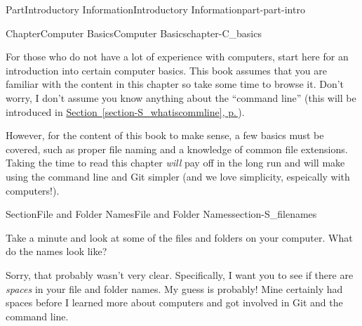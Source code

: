 \documentclass[twoside,10pt,]{book}
\newcommand{\xreffont}{\relax}
\begin{document}
\setcounter{tocdepth}{0}
\renewcommand*\contentsname{Contents}
\tableofcontents
\mainmatter
%
%
\typeout{************************************************}
\typeout{************************************************}
%
\begin{partptx}{Part}{Introductory Information}{}{Introductory Information}{}{}{part-part-intro}
\renewcommand*{\partname}{Part}
%
\typeout{************************************************}
\typeout{************************************************}
%
\begin{chapterptx}{Chapter}{Computer Basics}{}{Computer Basics}{}{}{chapter-C_basics}
\renewcommand*{\chaptername}{Chapter}
\begin{introduction}{}%
For those who do not have a lot of experience with computers, start here for an introduction into certain computer basics. This book assumes that you are familiar with the content in this chapter so take some time to browse it. Don't worry, I don't assume you know anything about the ``command line'' (this will be introduced in \hyperref[section-S_whatiscommline]{Section~{\xreffont\ref{section-S_whatiscommline}}, p.\,\pageref{section-S_whatiscommline}}).%
\par
However, for the content of this book to make sense, a few basics must be covered, such as proper file naming and a knowledge of common file extensions. Taking the time to read this chapter \emph{will} pay off in the long run and will make using the command line and Git simpler (and we love simplicity, espeically with computers!).%
\end{introduction}%
%
%
\typeout{************************************************}
\typeout{************************************************}
%
\begin{sectionptx}{Section}{File and Folder Names}{}{File and Folder Names}{}{}{section-S_filenames}
%
%
\begin{introduction}{}%
Take a minute and look at some of the files and folders on your computer. What do the names look like?%
\par
Sorry, that probably wasn't very clear. Specifically, I want you to see if there are \emph{spaces} in your file and folder names. My guess is probably! Mine certainly had spaces before I learned more about computers and got involved in Git and the command line.%

\end{introduction}
\end{sectionptx}
\end{chapterptx}
\end{partptx}
\end{document}
